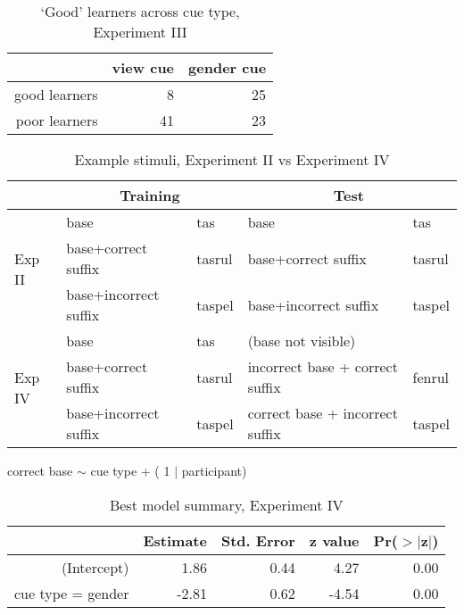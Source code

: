 \documentclass{frontiersSCNS} %
\begin{document}
\begin{table}[ht]
\centering
\begin{tabular}{rrr}
  \hline
 & view cue & gender cue \\ 
  \hline
good learners &   8 &  25 \\ 
poor learners &  41 &  23 \\ 
   \hline
\end{tabular}
\caption{ \large `Good' learners across cue type, Experiment III}
\label{exp3table}
\end{table}

\vspace{1cm}


\renewcommand{\tabcolsep}{3pt}
\begin{table}[ht]
\begin{center}
\begin{tabular}{||l||l|l|l|l||}
\hline
&\multicolumn{2}{c}{Training} & \multicolumn{2}{c}{Test} \\
\hline
\multirow{3}{*}{Exp II}	& base					& tas	&	base							& tas\\
						& base+correct suffix		& tasrul	&	base+correct suffix			&tasrul\\
						& base+incorrect suffix	& taspel	&	base+incorrect suffix			&taspel\\
\hline
\multirow{3}{*}{Exp IV}	& base					& tas 	& (base not visible)		&\\
						& base+correct suffix		& tasrul	&incorrect base + correct suffix	&fenrul\\
						& base+incorrect suffix	& taspel&correct base + incorrect suffix	&taspel\\

\hline
\end{tabular}
\caption{ \large  Example stimuli, Experiment II vs Experiment IV}
\label{exp4example}
\end{center}
\end{table}

\vspace{1cm}



\begin{table}[ht]
correct base $\sim$ cue type + ( 1 $|$ participant)\\
\centering
\begin{tabular}{rrrrr}
  \hline
 & Estimate & Std. Error & z value & Pr($>$$|$z$|$) \\ 
  \hline
(Intercept) & 1.86 & 0.44 & 4.27 & 0.00 \\ 
  cue type = gender & -2.81 & 0.62 & -4.54 & 0.00 \\ 
   \hline
\end{tabular}
\caption{ \large  Best model summary, Experiment IV}
\label{exp4summary}
\end{table}
\end{document}
